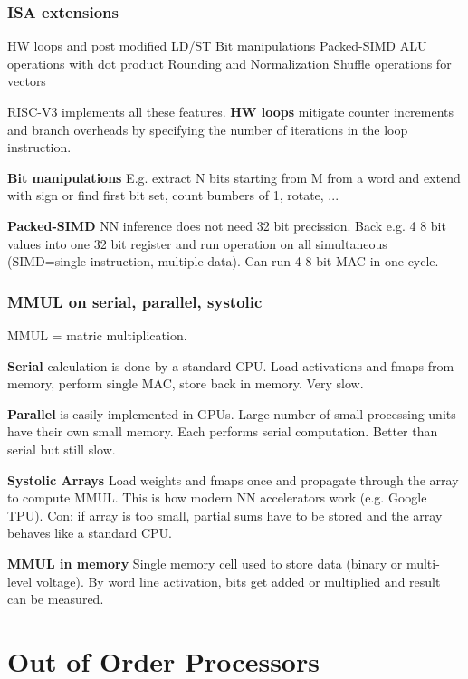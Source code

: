 \documentclass[a4paper, fontsize=8pt, landscape, DIV=1]{scrartcl}
\begin{document}
\begin{multicols*}{4}
  \subsubsection{ISA extensions}
  \begin{outline}
    \1 HW loops and post modified LD/ST
    \1 Bit manipulations
    \1 Packed-SIMD ALU operations with dot product
    \1 Rounding and Normalization
    \1 Shuffle operations for vectors
  \end{outline}

  RISC-V3 implements all these features.
  \textbf{HW loops} mitigate counter increments and branch overheads by specifying the
  number of iterations in the loop instruction.
  
  \textbf{Bit manipulations} E.g. extract N bits starting from M from a word and extend
  with sign or find first bit set, count bumbers of 1, rotate, ...

  \textbf{Packed-SIMD} NN inference does not need 32 bit precission. Back e.g. 4 8 bit
  values into one 32 bit register and run operation on all simultaneous (SIMD=single 
  instruction, multiple data). Can run 4 8-bit MAC in one cycle.

  \subsubsection{MMUL on serial, parallel, systolic}
  MMUL = matric multiplication.

  \textbf{Serial} calculation is done by a standard CPU. Load activations and fmaps
  from memory, perform single MAC, store back in memory. Very slow.

  \textbf{Parallel} is easily implemented in GPUs. Large number of small processing units
  have their own small memory. Each performs serial computation. Better than serial
  but still slow.

  \textbf{Systolic Arrays}
  Load weights and fmaps once and propagate through the array to compute MMUL. This is how
  modern NN accelerators work (e.g. Google TPU). Con: if array is too small, partial sums
  have to be stored and the array behaves like a standard CPU.

  \textbf{MMUL in memory} Single memory cell used to store data (binary or multi-level voltage).
  By word line activation, bits get added or multiplied and result can be measured.

  \section{Out of Order Processors}


\end{multicols*}
\end{document}
